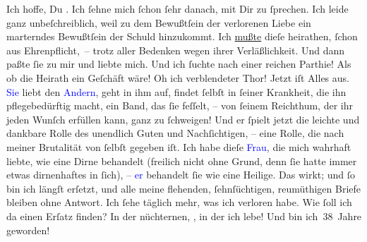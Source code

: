 \pstart
           Ich hoffe, Du \label{K_L03362-2v}\label{K_L03362-2h}. Ich ſehne mich ſchon ſehr danach, mit Dir zu ſprechen. Ich leide {\pb}ganz unbeſchreiblich, weil zu dem Bewußtſein der
               verlorenen Liebe ein marterndes Bewußtſein der Schuld hinzukommt. Ich \uline{mußte} dieſe \label{K_L03362-3v}\label{K_L03362-3h} heirathen, ſchon aus Ehrenpflicht, – trotz aller Bedenken wegen ihrer
               Verläßlichkeit. Und dann paßte ſie zu mir und liebte mich. Und ich ſuchte nach einer
               reichen Parthie! Als ob die Heirath ein Geſchäft wäre! Oh ich verblendeter Thor!
               Jetzt iſt {\pb}Alles aus. \textcolor{blue}{Sie}{}\ledrightnote{{$\rightarrow$}\textcolor{blue}{Theodore Rottenberg}} liebt den \textcolor{blue}{Andern}{}\ledrightnote{{$\rightarrow$}\textcolor{blue}{?? [Partner von Theodore Rottenberg, Ende 1902/Anfang 1903]}}, geht in ihm auf, findet ſelbſt in
               ſeiner Krankheit, die ihn pflegebedürftig macht, ein \strikeout{\textcolor{gray}{w}} Band, das ſie feſſelt, – von ſeinem Reichthum, der ihr jeden Wunſch erfüllen
               kann, ganz zu ſchweigen! Und er ſpielt  jetzt die
               leichte und dankbare Rolle des unendlich Guten und Nachſichtigen, – eine Rolle, die
               nach meiner Brutalität von ſelbſt gegeben iſt. Ich habe dieſe \textcolor{blue}{Frau}{}\ledrightnote{{$\rightarrow$}\textcolor{blue}{Theodore Rottenberg}}, die mich wahrhaft liebte, wie eine
                  {\pb}Dirne behandelt (freilich nicht ohne Grund, denn
               ſie hatte immer etwas dirnenhaftes in ſich), – \textcolor{blue}{er}{}\ledrightnote{{$\rightarrow$}\textcolor{blue}{?? [Partner von Theodore Rottenberg, Ende 1902/Anfang 1903]}} behandelt ſie wie eine
               Heilige. Das wirkt; und ſo bin ich längſt erſetzt, und alle meine flehenden,
               ſehnſüchtigen, reumüthigen Briefe bleiben ohne Antwort. Ich ſehe täglich mehr, was
               ich verloren habe. Wie ſoll ich da einen Erſatz finden? In der nüchternen, \label{K_L03362-6v}\label{K_L03362-6h}, in der ich lebe! Und \label{K_L03362-5v}\label{K_L03362-5h} bin ich 38 Jahre geworden!\pend
           

